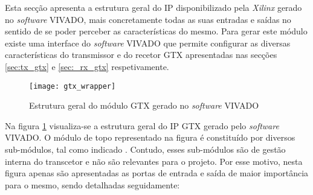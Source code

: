 Esta secção apresenta a estrutura geral do IP disponibilizado pela \textit{Xilinx} gerado no \textit{software} VIVADO, mais concretamente todas as suas entradas e saídas no sentido de se poder perceber as características do mesmo.  Para gerar este módulo existe uma interface do \textit{software} VIVADO que permite configurar as diversas características do transmissor e do recetor GTX apresentadas nas secções \ref{sec:tx_gtx} e \ref{sec:_rx_gtx} respetivamente. 

\begin{figure}[h!]
	\begin{center}
		\leavevmode
		\texttt{[image: gtx\_wrapper]}
		\captionsetup{width=1.0\linewidth}
		\caption[Estrutura geral do módulo GTX  gerado no \textit{software} VIVADO]{Estrutura geral do módulo GTX gerado no \textit{software} VIVADO}
		\label{fig:gtx_wrapper}
	\end{center}
\end{figure}

Na figura \ref{fig:gtx_wrapper} visualiza-se a estrutura geral do IP GTX gerado pelo \textit{software} VIVADO. O módulo de topo representado na figura é constituído por diversos sub-módulos, tal como indicado \cite{R022}. Contudo, esses sub-módulos são de gestão interna do transcetor e não são relevantes para o projeto. Por esse motivo, nesta figura apenas são apresentadas as portas de entrada e saída de maior importância para o mesmo, sendo detalhadas seguidamente:

